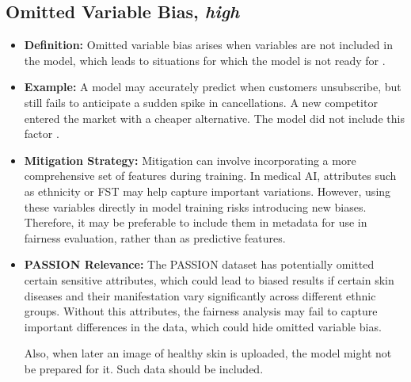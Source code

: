\documentclass[12pt, a4paper, oneside]{book}   	%
\begin{document}
\begin{appendices}
		\subsection{Omitted Variable Bias, \textit{high}}
		\begin{itemize}
			\item \textbf{Definition:} Omitted variable bias arises when variables are not included in the model, which leads to situations for which the model is not ready for \autocite{Mehrabi_2021, Mester_2017, M131_Riegg_2008, M114_Mustard_2003, M38_Clarke_2005}.
			\item \textbf{Example:} A model may accurately predict when customers unsubscribe, but still fails to anticipate a sudden spike in cancellations. A new competitor entered the market with a cheaper alternative. The model did not include this factor \autocite{Mehrabi_2021}.
			\item \textbf{Mitigation Strategy:} Mitigation can involve incorporating a more comprehensive set of features during training. In medical AI, attributes such as ethnicity or \gls{FST} may help capture important variations. However, using these variables directly in model training risks introducing new biases. Therefore, it may be preferable to include them in metadata for use in fairness evaluation, rather than as predictive features.
			\item \textbf{PASSION Relevance:} The PASSION dataset has potentially omitted certain sensitive attributes, which could lead to biased results if certain skin diseases and their manifestation vary significantly across different ethnic groups. Without this attributes, the fairness analysis may fail to capture important differences in the data, which could hide omitted variable bias.
			
			Also, when later an image of healthy skin is uploaded, the model might not be prepared for it. Such data should be included.
		\end{itemize}
		

\end{appendices}
\end{document}
